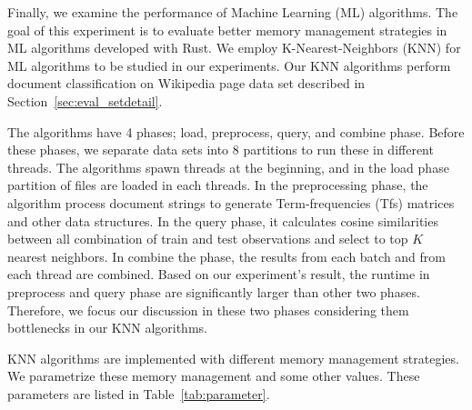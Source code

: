 Finally, we examine the performance of Machine Learning (ML) algorithms. 
The goal of this experiment is to evaluate better memory management strategies in ML algorithms developed with Rust.
We employ K-Nearest-Neighbors (KNN) for ML algorithms to be studied in our experiments.
Our KNN algorithms perform document classification on Wikipedia page data set described in Section~\ref{sec:eval_setdetail}. 

The algorithms have 4 phases; load, preprocess, query, and combine phase. 
Before these phases, we separate data sets into 8 partitions to run these in different threads. 
The algorithms spawn threads at the beginning, and in the load phase partition of files are loaded in each threads. 
In the preprocessing phase, the algorithm process document strings to generate Term-frequencies (Tfs) matrices and other data structures. 
In the query phase, it calculates cosine similarities between all combination of train and test observations and select to top \(K\) nearest neighbors. 
In combine the phase, the results from each batch and from each thread are combined. 
Based on our experiment's result, the runtime in preprocess and query phase are significantly larger than other two phases.
Therefore, we focus our discussion in these two phases considering them bottlenecks in our KNN algorithms.

KNN algorithms are implemented with different memory management strategies. 
We parametrize these memory management and some other values. These parameters are listed in Table~\ref{tab:parameter}. 

